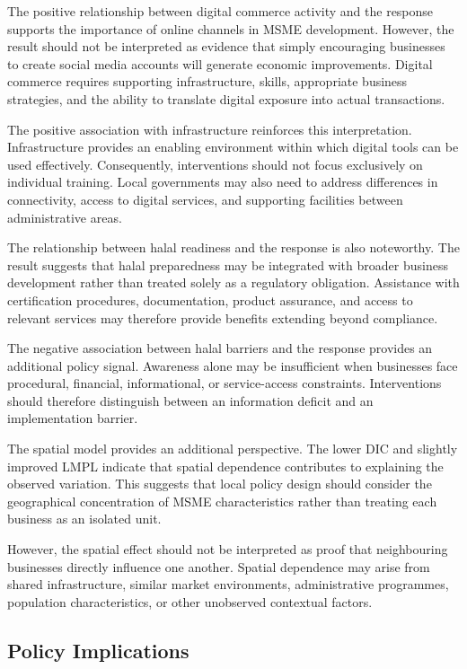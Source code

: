 \documentclass[
  default,
]{sn-jnl}
\begin{document}
The positive relationship between digital commerce activity and the
response supports the importance of online channels in MSME development.
However, the result should not be interpreted as evidence that simply
encouraging businesses to create social media accounts will generate
economic improvements. Digital commerce requires supporting
infrastructure, skills, appropriate business strategies, and the ability
to translate digital exposure into actual transactions.

The positive association with infrastructure reinforces this
interpretation. Infrastructure provides an enabling environment within
which digital tools can be used effectively. Consequently, interventions
should not focus exclusively on individual training. Local governments
may also need to address differences in connectivity, access to digital
services, and supporting facilities between administrative areas.

The relationship between halal readiness and the response is also
noteworthy. The result suggests that halal preparedness may be
integrated with broader business development rather than treated solely
as a regulatory obligation. Assistance with certification procedures,
documentation, product assurance, and access to relevant services may
therefore provide benefits extending beyond compliance.

The negative association between halal barriers and the response
provides an additional policy signal. Awareness alone may be
insufficient when businesses face procedural, financial, informational,
or service-access constraints. Interventions should therefore
distinguish between an information deficit and an implementation
barrier.

The spatial model provides an additional perspective. The lower DIC and
slightly improved LMPL indicate that spatial dependence contributes to
explaining the observed variation. This suggests that local policy
design should consider the geographical concentration of MSME
characteristics rather than treating each business as an isolated unit.

However, the spatial effect should not be interpreted as proof that
neighbouring businesses directly influence one another. Spatial
dependence may arise from shared infrastructure, similar market
environments, administrative programmes, population characteristics, or
other unobserved contextual factors.

\subsection{Policy Implications}\label{policy-implications}
\end{document}
